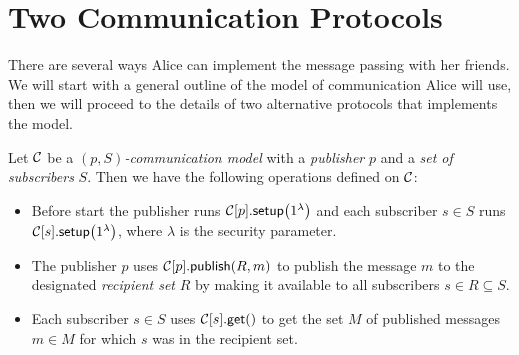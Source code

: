 %
%
\section{Two Communication Protocols}\label{PushAndPull}

There are several ways Alice can implement the message passing with her 
friends.
We will start with a general outline of the model of communication Alice will 
use, then we will proceed to the details of two alternative protocols that 
implements the model.

\begin{definition}\label{CommunicationModel}
  Let \(\operatorname{\mathcal{C}}\) be a \emph{\((p, S)\)-communication model} with 
  a \emph{publisher} \(p\) and a \emph{set of subscribers} \(S\).
  Then we have the following operations defined on \(\operatorname{\mathcal{C}}\):
  \begin{itemize}
    \item Before start the publisher runs \(\csetup{p}[1^\lambda]\) and each 
      subscriber \(s\in S\) runs \(\csetup{s}[1^\lambda]\), where \(\lambda\) 
      is the security parameter.
    \item The publisher \(p\) uses \(\cpub{p}[R][m]\) to publish the message 
      \(m\) to the designated \emph{recipient set} \(R\) by making it available 
      to all subscribers \(s\in R\subseteq S\).
    \item Each subscriber \(s\in S\) uses \(\cget{s}[]\) to get the set \(M\) 
      of published messages \(m\in M\) for which \(s\) was in the recipient 
      set.
  \end{itemize}
\end{definition}

